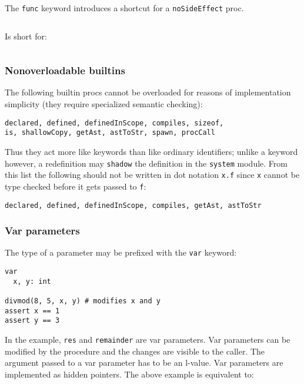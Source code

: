 The \texttt{func} keyword introduces a shortcut for a
\texttt{noSideEffect} proc.

\begin{verbatim}
\end{verbatim}

Is short for:

\begin{verbatim}
\end{verbatim}

\hypertarget{nonoverloadable-builtins}{%
\subsubsection{Nonoverloadable
builtins}\label{nonoverloadable-builtins}}

The following builtin procs cannot be overloaded for reasons of
implementation simplicity (they require specialized semantic checking):

\begin{verbatim}
declared, defined, definedInScope, compiles, sizeof,
is, shallowCopy, getAst, astToStr, spawn, procCall
\end{verbatim}

Thus they act more like keywords than like ordinary identifiers; unlike
a keyword however, a redefinition may \texttt{shadow} the definition in
the \texttt{system} module. From this list the following should not be
written in dot notation \texttt{x.f} since \texttt{x} cannot be type
checked before it gets passed to \texttt{f}:

\begin{verbatim}
declared, defined, definedInScope, compiles, getAst, astToStr
\end{verbatim}

\hypertarget{var-parameters}{%
\subsubsection{Var parameters}\label{var-parameters}}

The type of a parameter may be prefixed with the \texttt{var} keyword:

\begin{verbatim}
var
  x, y: int

divmod(8, 5, x, y) # modifies x and y
assert x == 1
assert y == 3
\end{verbatim}

In the example, \texttt{res} and \texttt{remainder} are {var
parameters}. Var parameters can be modified by the procedure and the
changes are visible to the caller. The argument passed to a var
parameter has to be an l-value. Var parameters are implemented as hidden
pointers. The above example is equivalent to:

